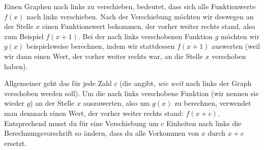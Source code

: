 \documentclass[../../main.tex]{subfiles}
\begin{document}
Einen Graphen nach links zu verschieben, bedeutet, dass sich alle Funktionwerte $f(x)$ nach links verschieben. Nach der Verschiebung möchten wir deswegen an der Stelle $x$ einen Funktionswert bekommen, der vorher weiter rechts stand, also zum Beispiel $f(x+1)$. Bei der nach links verschobenen Funktion $g$ möchten wir $g(x)$ beispielsweise berechnen, indem wir stattdessen $f(x+1)$ auswerten (weil wir dann einen Wert, der vorher weiter rechts war, an die Stelle $x$ verschoben haben).

Allgemeiner geht das für jede Zahl $c$ (die angibt, \emph{wie weit} nach links der Graph verschoben werden soll). Um die nach links verschobene Funktion (wir nennen sie wieder $g$) an der Stelle $x$ auszuwerten, also um $g(x)$ zu berechnen, verwendet man demnach einen Wert, der vorher weiter rechts stand: $f(x+c)$. Entsprechend musst du für eine Verschiebung um $c$ Einheiten nach links die Berechnungsvorschrift so ändern, dass du alle Vorkommen von $x$ durch $x+c$ ersetzt.
\end{document}

